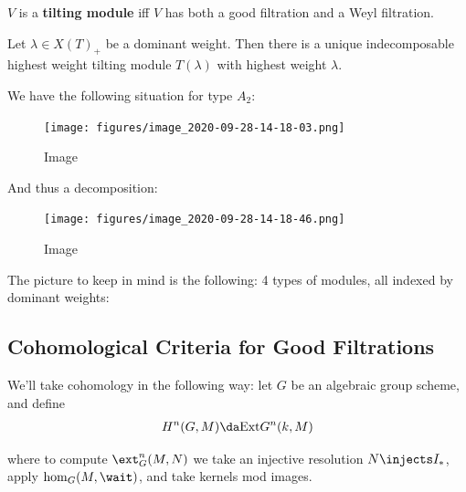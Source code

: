 \begin{definition}

\(V\) is a \textbf{tilting module} iff \(V\) has both a good filtration
and a Weyl filtration.

\end{definition}

\begin{theorem}[Ringel, 1990s]

Let \(\lambda \in X(T)_+\) be a dominant weight. Then there is a unique
indecomposable highest weight tilting module \(T(\lambda)\) with highest
weight \(\lambda\).

\end{theorem}

\begin{example}

We have the following situation for type \(A_2\):

\begin{figure}
\centering
\texttt{[image: figures/image\_2020-09-28-14-18-03.png]}
\caption{Image}
\end{figure}

And thus a decomposition:

\begin{figure}
\centering
\texttt{[image: figures/image\_2020-09-28-14-18-46.png]}
\caption{Image}
\end{figure}

\end{example}

The picture to keep in mind is the following: 4 types of modules, all
indexed by dominant weights:

\begin{center}\end{center}

\hypertarget{cohomological-criteria-for-good-filtrations}{%
\subsection{Cohomological Criteria for Good
Filtrations}\label{cohomological-criteria-for-good-filtrations}}

We'll take cohomology in the following way: let \(G\) be an algebraic
group scheme, and define
\begin{align*}  
H^n(G, M) \da 
\mathrm{Ext} G^n(k, M)
\end{align*}

where to compute \(\ext_G^n(M, N)\) we take an injective resolution
\(N \injects I_*\), apply \(\hom_G(M, \wait)\), and take kernels mod
images.

